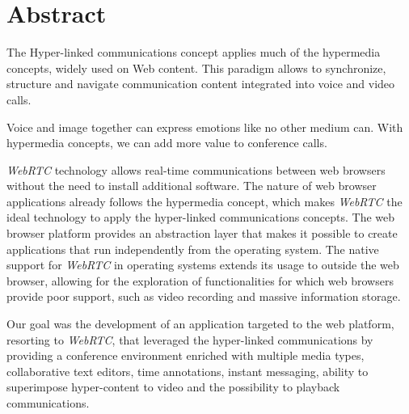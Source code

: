\chapter*{Abstract}


The Hyper-linked communications concept applies much of the hypermedia concepts, widely used on Web content. This paradigm allows to synchronize, structure and navigate communication content integrated into voice and video calls.

Voice and image together can express emotions like no other medium can. With hypermedia concepts, we can add more value to conference calls.

\emph{WebRTC} technology allows real-time communications between web browsers without the need to install additional software. The nature of web browser applications already follows the hypermedia concept, which makes \emph{WebRTC} the ideal technology to apply the hyper-linked communications concepts.
The web browser platform provides an abstraction layer that makes it possible to create applications that run independently from the operating system.
The native support for \emph{WebRTC} in operating systems extends its usage to outside the web browser, allowing for the exploration of functionalities for which web browsers provide poor support, such as video recording and massive information storage.



Our goal was the development of an application targeted to the web platform, resorting to \emph{WebRTC}, that leveraged the hyper-linked communications by providing a conference environment enriched with multiple media types, collaborative text editors, time annotations, instant messaging, ability to superimpose hyper-content to video and the possibility to playback communications.


